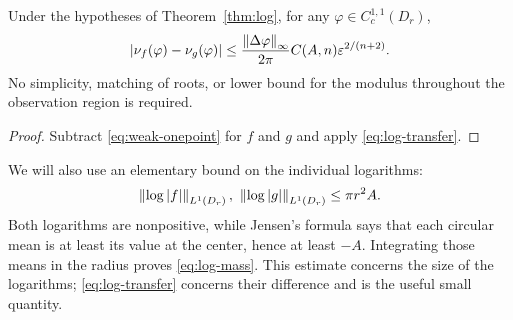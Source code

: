 \begin{corollary}\label{cor:weak-transfer}
Under the hypotheses of Theorem~\ref{thm:log}, for any
$\varphi\in C_c^{1,1}(D_r)$,
\begin{equation}\label{eq:weak-transfer}
 |\nu_f(\varphi)-\nu_g(\varphi)|
 \le \frac{\left\|\Delta\varphi\right\|_\infty}{2\pi}
              C(A,n)\varepsilon^{2/(n+2)} .
\end{equation}
No simplicity, matching of roots, or lower bound for the modulus
throughout the observation region is required.
\end{corollary}
\begin{proof}
Subtract \eqref{eq:weak-onepoint} for $f$ and $g$ and apply
\eqref{eq:log-transfer}.
\end{proof}

We will also use an elementary bound on the individual logarithms:
\begin{equation}\label{eq:log-mass}
 \left\|\log|f|\right\|_{L^1(D_r)},\
 \left\|\log|g|\right\|_{L^1(D_r)}
 \le \pi r^2A .
\end{equation}
Both logarithms are nonpositive, while Jensen's formula says that each
circular mean is at least its value at the center, hence at least
$-A$. Integrating those means in the radius proves
\eqref{eq:log-mass}. This estimate concerns the size of the logarithms;
\eqref{eq:log-transfer} concerns their difference and is the useful
small quantity.
